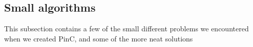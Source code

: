 \subsection{Small algorithms}
	This subsection contains a few of the small different problems we encountered when we
 	created PinC, and some of the more neat solutions
